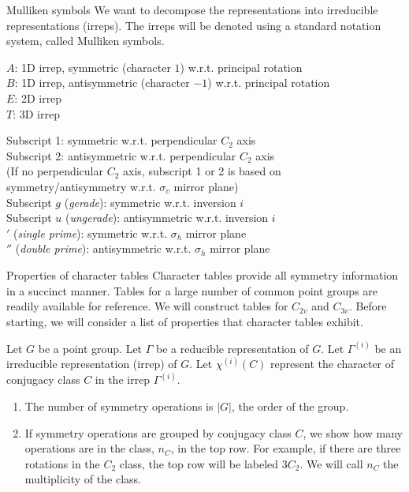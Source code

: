 \documentclass{beamer}
\newcommand{\vs}{\vspace{5mm}}
\begin{document}
    \begin{frame}{Mulliken symbols}
        We want to decompose the representations into irreducible representations (irreps). The irreps will be denoted using a standard notation system, called Mulliken symbols. \cite{mulliken1955}\vs

        {
            $A$: 1D irrep, symmetric (character $1$) w.r.t. principal rotation\\
            $B$: 1D irrep, antisymmetric (character $-1$) w.r.t. principal rotation\\
            $E$: 2D irrep\\
            $T$: 3D irrep
        }

        {
            Subscript 1: symmetric w.r.t. perpendicular $C_2$ axis\\
            Subscript 2: antisymmetric w.r.t. perpendicular $C_2$ axis\\
            (If no perpendicular $C_2$ axis, subscript 1 or 2 is based on symmetry/antisymmetry w.r.t. $\sigma_v$ mirror plane)\\
            Subscript $g$ (\emph{gerade}): symmetric w.r.t. inversion $i$\\
            Subscript $u$ (\emph{ungerade}): antisymmetric w.r.t. inversion $i$
            \\
            $'$ (\emph{single prime}): symmetric w.r.t. $\sigma_h$ mirror plane\\
            $''$ (\emph{double prime}): antisymmetric w.r.t. $\sigma_h$ mirror plane
        }
    \end{frame}
    
    \begin{frame}{Properties of character tables}
        Character tables provide all symmetry information in a succinct manner. Tables for a large number of common point groups are readily available for reference. We will construct tables for $C_{2v}$ and $C_{3v}$. Before starting, we will consider a list of properties that character tables exhibit. \cite{miessler2014,mcgrady2024,serre}
        \vs

        {
            Let $G$ be a point group. Let $\Gamma$ be a reducible representation of $G$. Let $\Gamma^{(i)}$ be an irreducible representation (irrep) of $G$. Let $\chi^{(i)}(C)$ represent the character of conjugacy class $C$ in the irrep $\Gamma^{(i)}$.
        }

        {
            \begin{enumerate}
                \item The number of symmetry operations is $|G|$, the order of the group.
                \item If symmetry operations are grouped by conjugacy class $C$, we show how many operations are in the class, $n_C$, in the top row. For example, if there are three rotations in the $C_2$ class, the top row will be labeled $3C_2$. We will call $n_C$ the multiplicity of the class.
            \end{enumerate}
        }
    \end{frame}
\end{document}
